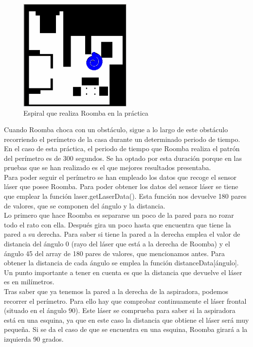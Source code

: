 \begin{figure}[H]
  \begin{center}
    \includegraphics[width=0.5\textwidth]{figures/Vacuum/Espiral_Roomba.png}
		\caption{Espiral que realiza Roomba en la práctica}
		\label{fig.Espiral_Roomba}
		\end{center}
\end{figure}

Cuando Roomba choca con un obstáculo, sigue a lo largo de este obstáculo recorriendo el perímetro de la casa durante un determinado periodo de tiempo. En el caso de esta práctica, el periodo de tiempo que Roomba realiza el patrón del perímetro es de 300 segundos. Se ha optado por esta duración porque en las pruebas que se han realizado es el que mejores resultados presentaba.\\

Para poder seguir el perímetro se han empleado los datos que recoge el sensor láser que posee Roomba. Para poder obtener los datos del sensor láser se tiene que emplear la función laser.getLaserData(). Esta función nos devuelve 180 pares de valores, que se componen del ángulo y la distancia.\\

Lo primero que hace Roomba es separarse un poco de la pared para no rozar todo el rato con ella. Después gira un poco hasta que encuentra que tiene la pared a su derecha. Para saber si tiene la pared a la derecha emplea el valor de distancia del ángulo 0 (rayo del láser que está a la derecha de Roomba) y el ángulo 45 del array de 180 pares de valores, que mencionamos antes. Para obtener la distancia de cada ángulo se emplea la función distanceData[ángulo]. Un punto importante a tener en cuenta es que la distancia que devuelve el láser es en milímetros.  \\

Tras saber que ya tenemos la pared a la derecha de la aspiradora, podemos recorrer el perímetro. Para ello hay que comprobar continuamente el láser frontal (situado en el ángulo 90). Este láser se comprueba para saber si la aspiradora está en una esquina, ya que en este caso la distancia que obtiene el láser será muy pequeña. Si se da el caso de que se encuentra en una esquina, Roomba girará a la izquierda 90 grados. \\


